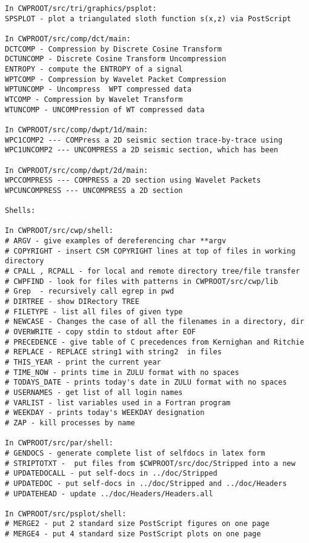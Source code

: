 {\begin{verbatim}
In CWPROOT/src/tri/graphics/psplot:
SPSPLOT - plot a triangulated sloth function s(x,z) via PostScript	

In CWPROOT/src/comp/dct/main:
DCTCOMP - Compression by Discrete Cosine Transform			
DCTUNCOMP - Discrete Cosine Transform Uncompression 			
ENTROPY - compute the ENTROPY of a signal			
WPTCOMP - Compression by Wavelet Packet Compression 			
WPTUNCOMP - Uncompress  WPT compressed data				
WTCOMP - Compression by Wavelet Transform				
WTUNCOMP - UNCOMPression of WT compressed data			

In CWPROOT/src/comp/dwpt/1d/main:
WPC1COMP2 --- COMPress a 2D seismic section trace-by-trace using 	
WPC1UNCOMP2 --- UNCOMPRESS a 2D seismic section, which has been	

In CWPROOT/src/comp/dwpt/2d/main:
WPCCOMPRESS --- COMPRESS a 2D section using Wavelet Packets		
WPCUNCOMPRESS --- UNCOMPRESS a 2D section 				

Shells: 

In CWPROOT/src/cwp/shell:
# ARGV - give examples of dereferencing char **argv
# COPYRIGHT - insert CSM COPYRIGHT lines at top of files in working directory
# CPALL , RCPALL - for local and remote directory tree/file transfer
# CWPFIND - look for files with patterns in CWPROOT/src/cwp/lib
# Grep  - recursively call egrep in pwd
# DIRTREE - show DIRectory TREE
# FILETYPE - list all files of given type
# NEWCASE - Changes the case of all the filenames in a directory, dir
# OVERWRITE - copy stdin to stdout after EOF
# PRECEDENCE - give table of C precedences from Kernighan and Ritchie
# REPLACE - REPLACE string1 with string2  in files
# THIS_YEAR - print the current year
# TIME_NOW - prints time in ZULU format with no spaces 
# TODAYS_DATE - prints today's date in ZULU format with no spaces 
# USERNAMES - get list of all login names
# VARLIST - list variables used in a Fortran program
# WEEKDAY - prints today's WEEKDAY designation
# ZAP - kill processes by name

In CWPROOT/src/par/shell:
# GENDOCS - generate complete list of selfdocs in latex form
# STRIPTOTXT -  put files from $CWPROOT/src/doc/Stripped into a new
# UPDATEDOCALL - put self-docs in ../doc/Stripped
# UPDATEDOC - put self-docs in ../doc/Stripped and ../doc/Headers
# UPDATEHEAD - update ../doc/Headers/Headers.all

In CWPROOT/src/psplot/shell:
# MERGE2 - put 2 standard size PostScript figures on one page
# MERGE4 - put 4 standard size PostScript plots on one page


\end{verbatim}}
